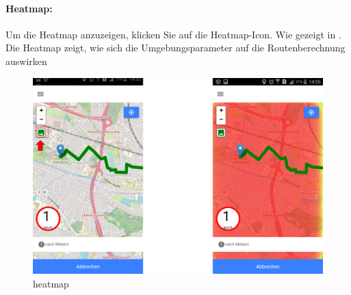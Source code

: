 \newpage
\paragraph{Heatmap:}
Um die Heatmap anzuzeigen, klicken Sie auf die Heatmap-Icon. Wie gezeigt in .\\
Die Heatmap zeigt, wie sich die Umgebungsparameter auf die Routenberechnung auswirken
\begin{figure}[h!]
\centerline{\includegraphics[height=6 cm]{./ressourcen/nutzerhandbuch/heatmap.png}}
\caption{heatmap}
\label{fig:app:heatmap}
\end{figure}
